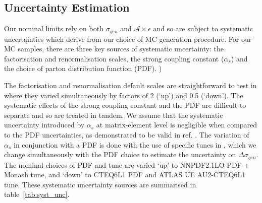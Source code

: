 
\subsection{Uncertainty Estimation}
Our nominal limits rely on both $\sigma_{gen}$ and $\mathcal{A}\times\epsilon$ and so are subject to systematic uncertainties which derive from our choice of MC generation procedure. For our MC samples, there are three key sources of systematic uncertainty: the factorisation and renormalisation scales, the strong coupling constant ($\alpha_{s}$) and the choice of parton distribution function (PDF).
)

%
%
The factorisation and renormalisation default scales are straightforward to test in \MG where they varied simultaneously by factors of 2 (`up') and 0.5 (`down'). The systematic effects of the strong coupling constant and the PDF are difficult to separate and so are treated in tandem. We assume that the systematic uncertainty introduced by $\alpha_{s}$ at matrix-element level is negligible when compared to the PDF uncertainties, as demonstrated to be valid in ref. \cite{CERN-THESIS-2015-038}. The variation of $\alpha_{s}$ in conjunction with a PDF is done with the use of specific tunes in \PYTHIA, which we change simultaneously with the PDF choice to estimate the uncertainty on $\Delta \sigma_{gen}$. The nominal choices of PDF and tune are varied `up' to NNPDF2.1LO PDF + Monash tune, and `down' to CTEQ6L1 PDF and ATLAS UE AU2-CTEQ6L1 tune.  These systematic uncertainty sources are summarised in table~\ref{tab:syst_unc}.

